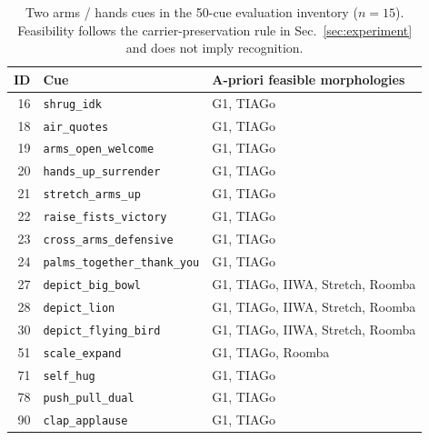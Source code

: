 \begin{table}[t]
\centering
\scriptsize
\setlength{\tabcolsep}{3pt}
\renewcommand{\arraystretch}{1.05}
\begin{tabularx}{\columnwidth}{@{}r>{\raggedright\arraybackslash}X>{\raggedright\arraybackslash}p{2.3cm}@{}}
\toprule
\textbf{ID} & \textbf{Cue} & \textbf{A-priori feasible morphologies} \\
\midrule
16 & \texttt{shrug\_idk} & G1, TIAGo \\
18 & \texttt{air\_quotes} & G1, TIAGo \\
19 & \texttt{arms\_open\_welcome} & G1, TIAGo \\
20 & \texttt{hands\_up\_surrender} & G1, TIAGo \\
21 & \texttt{stretch\_arms\_up} & G1, TIAGo \\
22 & \texttt{raise\_fists\_victory} & G1, TIAGo \\
23 & \texttt{cross\_arms\_defensive} & G1, TIAGo \\
24 & \texttt{palms\_together\_thank\_you} & G1, TIAGo \\
27 & \texttt{depict\_big\_bowl} & G1, TIAGo, IIWA, Stretch, Roomba \\
28 & \texttt{depict\_lion} & G1, TIAGo, IIWA, Stretch, Roomba \\
30 & \texttt{depict\_flying\_bird} & G1, TIAGo, IIWA, Stretch, Roomba \\
51 & \texttt{scale\_expand} & G1, TIAGo, Roomba \\
71 & \texttt{self\_hug} & G1, TIAGo \\
78 & \texttt{push\_pull\_dual} & G1, TIAGo \\
90 & \texttt{clap\_applause} & G1, TIAGo \\
\bottomrule
\end{tabularx}
\caption{Two arms / hands cues in the 50-cue evaluation inventory ($n=15$). Feasibility follows the carrier-preservation rule in Sec.~\ref{sec:experiment} and does not imply recognition.}
\label{tab:cue-inventory-50-4}
\end{table}
